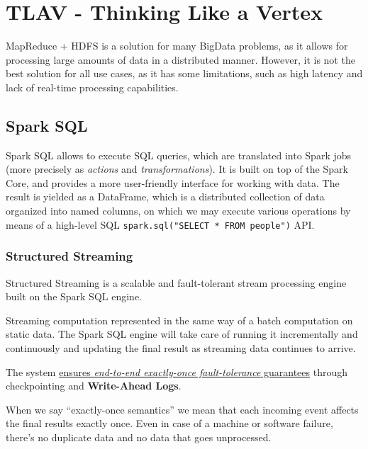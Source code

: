 \chapter{TLAV - Thinking Like a Vertex}

MapReduce + HDFS is a solution for many BigData problems, as it allows for processing large amounts of data in a distributed manner. However, it is not the best solution for all use cases, as it has some limitations, such as high latency and lack of real-time processing capabilities.


\section{Spark SQL}
Spark SQL allows to execute SQL queries, which are translated into Spark jobs (more precisely as \textit{actions} and \textit{transformations}). It is built on top of the Spark Core, and provides a more user-friendly interface for working with data.
The result is yielded as a DataFrame, which is a distributed collection of data organized into named columns, on which we may execute various operations by means of a high-level SQL \verb|spark.sql("SELECT * FROM people")| API.

\subsection{Structured Streaming}
Structured Streaming is a scalable and fault-tolerant stream processing engine built on the Spark SQL engine.


Streaming computation represented in the same way of a batch computation on static data.
The Spark SQL engine will take care of running it incrementally and continuously and updating the final result as streaming data continues to arrive.

The system \ul{ensures \textit{end-to-end exactly-once fault-tolerance} guarantees} through
checkpointing and \textbf{Write-Ahead Logs}.

When we say ``exactly-once semantics'' we mean that each incoming event affects the final results exactly once. Even in case of a machine or software failure, there’s no duplicate data and no data that goes unprocessed.

